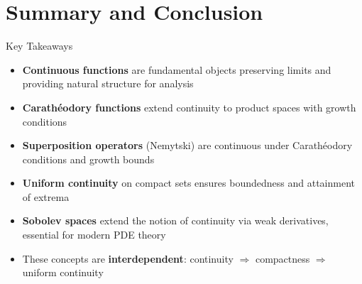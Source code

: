 \documentclass[aspectratio=169,10pt]{beamer}
\begin{document}
\section{Summary and Conclusion}

\begin{frame}{Key Takeaways}
    \begin{itemize}
        \item \textbf{Continuous functions} are fundamental objects preserving limits and providing natural structure for analysis

        \item \textbf{Carathéodory functions} extend continuity to product spaces with growth conditions

        \item \textbf{Superposition operators} (Nemytski) are continuous under Carathéodory conditions and growth bounds

        \item \textbf{Uniform continuity} on compact sets ensures boundedness and attainment of extrema

        \item \textbf{Sobolev spaces} extend the notion of continuity via weak derivatives, essential for modern PDE theory

        \item These concepts are \textbf{interdependent}: continuity $\Rightarrow$ compactness $\Rightarrow$ uniform continuity
    \end{itemize}
\end{frame}
\end{document}
